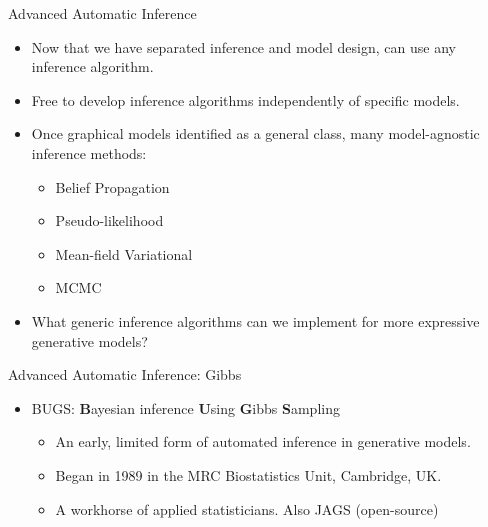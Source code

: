 
\begin{frame}{Advanced Automatic Inference}

    \begin{itemize}
      \item Now that we have separated inference and model design, can use any inference algorithm.
      \item Free to develop inference algorithms independently of specific models.
      \item Once graphical models identified as a general class, many model-agnostic inference methods:
      \begin{itemize}
	      \item Belief Propagation
	      \item Pseudo-likelihood
	      \item Mean-field Variational
	      \item MCMC
	    \end{itemize}
    \item What generic inference algorithms can we implement for more expressive generative models?
    \end{itemize}
\end{frame}


\begin{frame}{Advanced Automatic Inference: Gibbs}
    \begin{itemize}
      \item BUGS: {\bf B}ayesian inference {\bf U}sing {\bf G}ibbs {\bf S}ampling
        \begin{itemize}
      \item An early, limited form of automated inference in generative models.
      \item Began in 1989 in the MRC Biostatistics Unit, Cambridge, UK.
      \item A workhorse of applied statisticians.  Also JAGS (open-source)
    \end{itemize}
    \end{itemize}
    
\begin{alltt}
{\tiny
}
\end{alltt}    

\end{frame}

